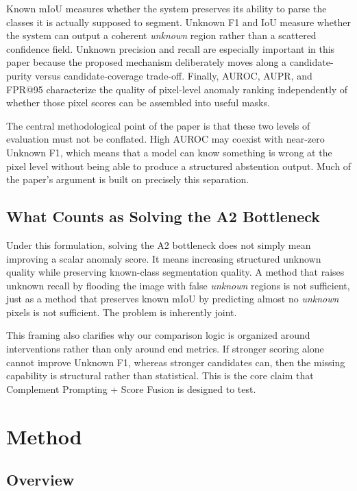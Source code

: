 \documentclass[a4paper,fleqn]{cas-dc}
\newcommand{\method}{Complement Prompting + Score Fusion}
\newcommand{\unknown}{\textit{unknown}}
\begin{document}
Known mIoU measures whether the system preserves its ability to parse the classes it is actually supposed to segment. Unknown F1 and IoU measure whether the system can output a coherent \unknown{} region rather than a scattered confidence field. Unknown precision and recall are especially important in this paper because the proposed mechanism deliberately moves along a candidate-purity versus candidate-coverage trade-off. Finally, AUROC, AUPR, and FPR@95 characterize the quality of pixel-level anomaly ranking independently of whether those pixel scores can be assembled into useful masks.

The central methodological point of the paper is that these two levels of evaluation must not be conflated. High AUROC may coexist with near-zero Unknown F1, which means that a model can know something is wrong at the pixel level without being able to produce a structured abstention output. Much of the paper's argument is built on precisely this separation.

\subsection{What Counts as Solving the A2 Bottleneck}
\label{sec:problem:bottleneck}

Under this formulation, solving the A2 bottleneck does not simply mean improving a scalar anomaly score. It means increasing structured unknown quality while preserving known-class segmentation quality. A method that raises unknown recall by flooding the image with false \unknown{} regions is not sufficient, just as a method that preserves known mIoU by predicting almost no \unknown{} pixels is not sufficient. The problem is inherently joint.

This framing also clarifies why our comparison logic is organized around interventions rather than only around end metrics. If stronger scoring alone cannot improve Unknown F1, whereas stronger candidates can, then the missing capability is structural rather than statistical. This is the core claim that \method{} is designed to test.

\section{Method}
\label{sec:method}

\subsection{Overview}
\label{sec:method:overview}
\end{document}
